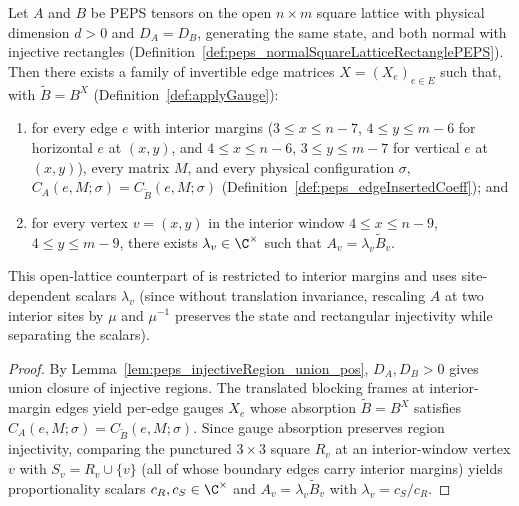 \begin{corollary}%
    \label{thm:fundamentalTheorem_normalSquarePEPS_unconditional}
    \leanok
    Let $A$ and $B$ be PEPS tensors on the open $n\times m$ square lattice
    with physical dimension $d>0$ and $D_A=D_B$, generating the same state, and
    both normal with injective rectangles
    (Definition~\ref{def:peps_normalSquareLatticeRectanglePEPS}). Then there
    exists a family of invertible edge matrices $X=(X_e)_{e\in E}$ such that,
    with $\widetilde B=B^X$ (Definition~\ref{def:applyGauge}):
    \begin{enumerate}
        \item for every edge $e$ with interior margins ($3\le x\le n-7$,
              $4\le y\le m-6$ for horizontal $e$ at $(x,y)$, and $4\le x\le n-6$,
              $3\le y\le m-7$ for vertical $e$ at $(x,y)$), every matrix $M$,
              and every physical configuration $\sigma$,
              $C_A(e,M;\sigma)=C_{\widetilde B}(e,M;\sigma)$
              (Definition~\ref{def:peps_edgeInsertedCoeff}); and
        \item for every vertex $v=(x,y)$ in the interior window
              $4\le x\le n-9$, $4\le y\le m-9$, there exists
              $\lambda_v\in\C^\times$ such that $A_v=\lambda_v\widetilde B_v$.
    \end{enumerate}
    This open-lattice counterpart of \cite[Theorem~3]{Molnar2018NormalPEPS} is
    restricted to interior margins and uses site-dependent scalars $\lambda_v$
    (since without translation invariance, rescaling $A$ at two interior sites
    by $\mu$ and $\mu^{-1}$ preserves the state and rectangular injectivity
    while separating the scalars).
    \begin{proof}
        \leanok
        By Lemma~\ref{lem:peps_injectiveRegion_union_pos}, $D_A,D_B>0$ gives
        union closure of injective regions. The translated blocking frames at
        interior-margin edges yield per-edge gauges $X_e$ whose absorption
        $\widetilde B=B^X$ satisfies $C_A(e,M;\sigma)=C_{\widetilde B}(e,M;\sigma)$.
        Since gauge absorption preserves region injectivity, comparing the
        punctured $3\times 3$ square $R_v$ at an interior-window vertex $v$ with
        $S_v=R_v\cup\{v\}$ (all of whose boundary edges carry interior margins)
        yields proportionality scalars $c_R,c_S\in\C^\times$ and
        $A_v=\lambda_v\widetilde B_v$ with $\lambda_v=c_S/c_R$.
    \end{proof}
\end{corollary}
